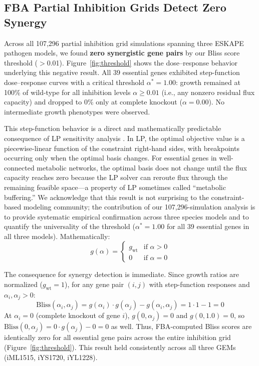 \documentclass[12pt,a4paper]{article}
\begin{document}
\subsection{FBA Partial Inhibition Grids Detect Zero Synergy}

Across all 107,296 partial inhibition grid simulations spanning three ESKAPE pathogen models, we found \textbf{zero synergistic gene pairs} by our Bliss score threshold ($>$0.01). Figure~\ref{fig:threshold} shows the dose--response behavior underlying this negative result. All 39 essential genes exhibited step-function dose--response curves with a critical threshold $\alpha^* = 1.00$: growth remained at 100\% of wild-type for all inhibition levels $\alpha \geq 0.01$ (i.e., any nonzero residual flux capacity) and dropped to 0\% only at complete knockout ($\alpha = 0.00$). No intermediate growth phenotypes were observed.

This step-function behavior is a direct and mathematically predictable consequence of LP sensitivity analysis \citep{bertsimas1997}. In LP, the optimal objective value is a piecewise-linear function of the constraint right-hand sides, with breakpoints occurring only when the optimal basis changes. For essential genes in well-connected metabolic networks, the optimal basis does not change until the flux capacity reaches zero because the LP solver can reroute flux through the remaining feasible space---a property of LP sometimes called ``metabolic buffering.'' We acknowledge that this result is not surprising to the constraint-based modeling community; the contribution of our 107,296-simulation analysis is to provide systematic empirical confirmation across three species models and to quantify the universality of the threshold ($\alpha^* = 1.00$ for all 39 essential genes in all three models). Mathematically:
\begin{equation}
g(\alpha) = \begin{cases} g_{\text{wt}} & \text{if } \alpha > 0 \\ 0 & \text{if } \alpha = 0 \end{cases}
\label{eq:step}
\end{equation}

The consequence for synergy detection is immediate. Since growth ratios are normalized ($g_{\text{wt}} = 1$), for any gene pair $(i, j)$ with step-function responses and $\alpha_i, \alpha_j > 0$:
\begin{equation}
\text{Bliss}(\alpha_i, \alpha_j) = g(\alpha_i) \cdot g(\alpha_j) - g(\alpha_i, \alpha_j) = 1 \cdot 1 - 1 = 0
\label{eq:bliss_zero}
\end{equation}
At $\alpha_i = 0$ (complete knockout of gene $i$), $g(0, \alpha_j) = 0$ and $g(0, 1.0) = 0$, so $\text{Bliss}(0, \alpha_j) = 0 \cdot g(\alpha_j) - 0 = 0$ as well. Thus, FBA-computed Bliss scores are identically zero for all essential gene pairs across the entire inhibition grid (Figure~\ref{fig:threshold}). This result held consistently across all three GEMs (iML1515, iYS1720, iYL1228).
\end{document}
